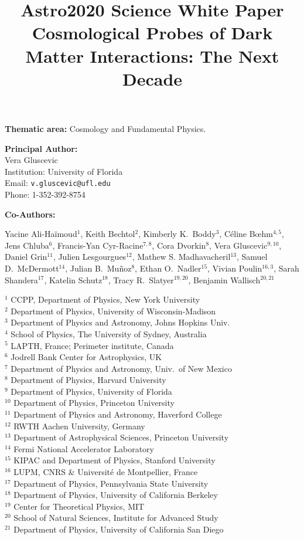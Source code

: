 \documentclass[12pt]{article}
\title{{Astro2020 Science White Paper}\\
\vspace{0.7cm}
\bf{Cosmological Probes of Dark Matter Interactions: The Next Decade}}
\date{}
\author{}
\begin{document}
\maketitle
\vspace{-2cm}
\begin{center}
\textbf{Thematic area:} Cosmology and Fundamental Physics.     
\end{center}

\noindent\textbf{Principal Author:} \\
Vera Gluscevic\\
Institution: University of Florida\\
Email: \texttt{v.gluscevic@ufl.edu}\\
Phone: 1-352-392-8754

\vspace{0.5cm}
\noindent\textbf{Co-Authors:}

\noindent 
{Yacine Ali-Ha\"imoud$^{1}$, Keith Bechtol$^{2}$, Kimberly K.~Boddy$^{3}$, C\'eline B\oe{}hm$^{4,5}$, Jens Chluba$^{6}$, Francis-Yan Cyr-Racine$^{7,8}$, Cora Dvorkin$^{8}$, Vera Gluscevic$^{9,10}$, Daniel Grin$^{11}$, Julien Lesgourgues$^{12}$, Mathew S. Madhavacheril$^{13}$, Samuel D.~McDermott$^{14}$, Julian B.~Mu\~noz$^{8}$, Ethan O.~Nadler$^{15}$, Vivian Poulin$^{16,3}$, Sarah Shandera$^{17}$, Katelin Schutz$^{18}$, Tracy R.~Slatyer$^{19,20}$, Benjamin Wallisch$^{20,21}$}

\def\affil#1{\noindent #1 \\}

\begin{multicols}{2}
\scriptsize
\affil{$^{1}$ CCPP, Department of Physics, New York University}
\affil{$^{2}$ Department of Physics, University of Wisconsin-Madison}
\affil{$^{3}$ Department of Physics and Astronomy, Johns Hopkins Univ.}
\affil{$^{4}$ School of Physics, The University of Sydney, Australia}
\affil{$^{5}$ LAPTH, France; Perimeter institute, Canada}
\affil{$^{6}$ Jodrell Bank Center for Astrophysics, UK}
\affil{$^{7}$ Department of Physics and Astronomy, Univ.~of New Mexico}
\affil{$^{8}$ Department of Physics, Harvard University}
\affil{$^{9}$ Department of Physics, University of Florida}
\affil{$^{10}$ Department of Physics, Princeton University}
\affil{$^{11}$ Department of Physics and Astronomy, Haverford College}
\affil{$^{12}$ RWTH Aachen University, Germany}
\affil{$^{13}$ Department of Astrophysical Sciences, Princeton University}
\affil{$^{14}$ Fermi National Accelerator Laboratory}
\affil{$^{15}$ KIPAC and Department of Physics, Stanford University}
\affil{$^{16}$ LUPM, CNRS \& Universit\'e de Montpellier, France}
\affil{$^{17}$ Department of Physics, Pennsylvania State University}
\affil{$^{18}$ Department of Physics, University of California Berkeley}
\affil{$^{19}$ Center for Theoretical Physics, MIT}
\affil{$^{20}$ School of Natural Sciences, Institute for Advanced Study}
\affil{$^{21}$ Department of Physics, University of California San Diego}


\normalsize
\end{multicols}
\end{document}
